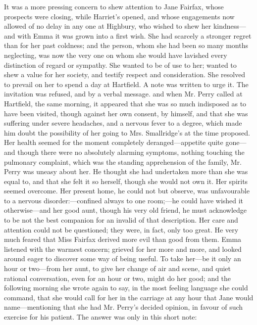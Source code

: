 It was a more pressing concern to shew attention to Jane Fairfax, whose prospects were closing, while Harriet's opened, and whose engagements now allowed of no delay in any one at Highbury, who wished to shew her kindness---and with Emma it was grown into a first wish. She had scarcely a stronger regret than for her past coldness; and the person, whom she had been so many months neglecting, was now the very one on whom she would have lavished every distinction of regard or sympathy. She wanted to be of use to her; wanted to shew a value for her society, and testify respect and consideration. She resolved to prevail on her to spend a day at Hartfield. A note was written to urge it. The invitation was refused, and by a verbal message.  and when Mr. Perry called at Hartfield, the same morning, it appeared that she was so much indisposed as to have been visited, though against her own consent, by himself, and that she was suffering under severe headaches, and a nervous fever to a degree, which made him doubt the possibility of her going to Mrs. Smallridge's at the time proposed. Her health seemed for the moment completely deranged---appetite quite gone---and though there were no absolutely alarming symptoms, nothing touching the pulmonary complaint, which was the standing apprehension of the family, Mr. Perry was uneasy about her. He thought she had undertaken more than she was equal to, and that she felt it so herself, though she would not own it. Her spirits seemed overcome. Her present home, he could not but observe, was unfavourable to a nervous disorder:---confined always to one room;---he could have wished it otherwise---and her good aunt, though his very old friend, he must acknowledge to be not the best companion for an invalid of that description. Her care and attention could not be questioned; they were, in fact, only too great. He very much feared that Miss Fairfax derived more evil than good from them. Emma listened with the warmest concern; grieved for her more and more, and looked around eager to discover some way of being useful. To take her---be it only an hour or two---from her aunt, to give her change of air and scene, and quiet rational conversation, even for an hour or two, might do her good; and the following morning she wrote again to say, in the most feeling language she could command, that she would call for her in the carriage at any hour that Jane would name---mentioning that she had Mr. Perry's decided opinion, in favour of such exercise for his patient. The answer was only in this short note:

